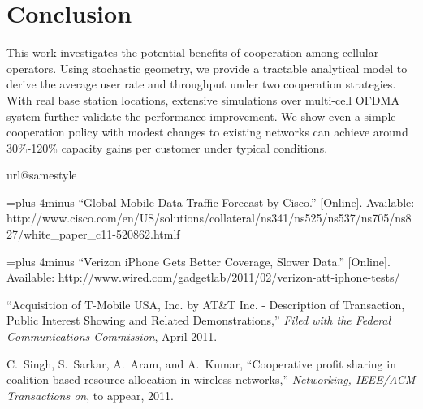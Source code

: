 \documentclass[conference]{IEEEtran}
\begin{document}
\section{Conclusion}

This work investigates the potential benefits of cooperation among cellular operators. Using stochastic geometry, we provide a tractable analytical model to derive the average user rate and throughput under two cooperation strategies. With real base station locations, extensive simulations over multi-cell OFDMA system further validate the performance improvement. We show even a simple cooperation policy with modest changes to existing networks can achieve around 30\%-120\% capacity gains per customer under typical conditions.


\begin{thebibliography}{10}
\providecommand{\url}[1]{#1}
\csname url@samestyle\endcsname
\providecommand{\newblock}{\relax}
\providecommand{\bibinfo}[2]{#2}
\providecommand{\BIBentrySTDinterwordspacing}{\spaceskip=0pt\relax}
\providecommand{\BIBentryALTinterwordstretchfactor}{4}
\providecommand{\BIBentryALTinterwordspacing}{\spaceskip=\fontdimen2\font plus
\BIBentryALTinterwordstretchfactor\fontdimen3\font minus
  \fontdimen4\font\relax}
\providecommand{\BIBforeignlanguage}[2]{{\expandafter\ifx\csname l@#1\endcsname\relax
\typeout{** WARNING: IEEEtran.bst: No hyphenation pattern has been}\typeout{** loaded for the language `#1'. Using the pattern for}\typeout{** the default language instead.}\else
\language=\csname l@#1\endcsname
\fi
#2}}
\providecommand{\BIBdecl}{\relax}
\BIBdecl

\BIBentryALTinterwordspacing
``{Global Mobile Data Traffic Forecast by Cisco}.'' [Online]. Available:
  \url{http://www.cisco.com/en/US/solutions/collateral/ns341/ns525/ns537/ns705/ns827/white_paper_c11-520862.htmlf}
\BIBentrySTDinterwordspacing

\BIBentryALTinterwordspacing
``{Verizon iPhone Gets Better Coverage, Slower Data}.'' [Online]. Available:
  \url{http://www.wired.com/gadgetlab/2011/02/verizon-att-iphone-tests/}
\BIBentrySTDinterwordspacing

``{Acquisition of T-Mobile USA, Inc. by AT\&T Inc. - Description of
  Transaction, Public Interest Showing and Related Demonstrations},''
  \emph{Filed with the Federal Communications Commission}, April 2011.

C.~Singh, S.~Sarkar, A.~Aram, and A.~Kumar, ``{Cooperative profit sharing in
  coalition-based resource allocation in wireless networks},''
  \emph{Networking, IEEE/ACM Transactions on}, to appear, 2011.


\end{thebibliography}
\end{document}
